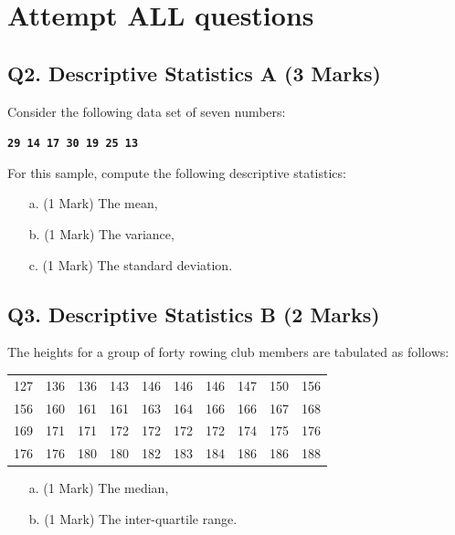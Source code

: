 \documentclass[a4paper,12pt]{article}
\begin{document}
\section*{Attempt ALL questions}
\subsection*{Q2. Descriptive Statistics A (3 Marks)} %
Consider the following data set of seven numbers:

\begin{center}
	\textbf{\texttt{29 14 17 30 19 25 13}}
\end{center}

\noindent For this sample, compute the following descriptive statistics:
\begin{itemize}
	\item[a.] (1 Mark) The mean,
	\item[b.] (1 Mark) The variance,
	\item[c.] (1 Mark) The standard deviation.
\end{itemize}

\subsection*{Q3. Descriptive Statistics B (2 Marks)} %
The heights for a group of forty rowing club members are tabulated as follows:

\begin{table}[ht]
	\begin{center}
		\begin{tabular}{|rrrrrrrrrr|}
			
			\hline
			127& 136& 136& 143& 146& 146& 146& 147& 150& 156\\
			156& 160& 161& 161& 163& 164& 166& 166& 167& 168\\
			169& 171& 171& 172& 172& 172& 172& 174& 175& 176\\
			176& 176& 180& 180& 182& 183& 184& 186& 186& 188\\
			\hline
		\end{tabular}
	\end{center}
\end{table}
\vspace{-0.5cm}
\begin{itemize}
	\item[a.] (1 Mark) The median,
	\item[b.] (1 Mark) The inter-quartile range.
\end{itemize}
\end{document}
